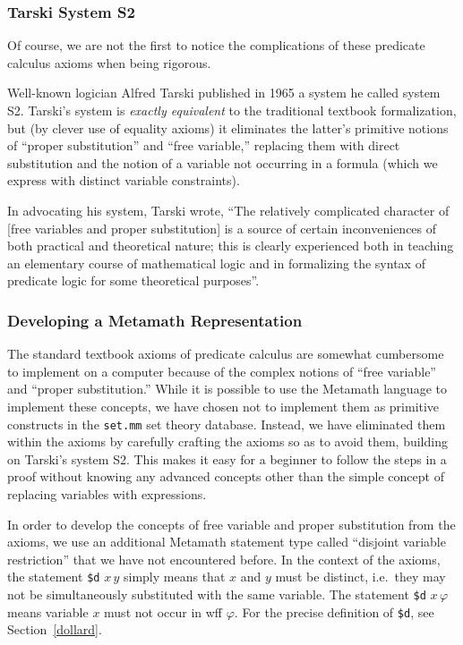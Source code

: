 \subsubsection{Tarski System S2}

Of course, we are not the first to notice the complications of these
predicate calculus axioms when being rigorous.

Well-known logician Alfred Tarski published in 1965
a system he called system S2\cite[p.~77]{Tarski1965}.
Tarski's system is \textit{exactly equivalent} to the traditional textbook
formalization, but (by clever use of equality axioms) it eliminates the
latter's primitive notions of ``proper substitution'' and ``free variable,''
replacing them with direct substitution and the notion of a variable
not occurring in a formula (which we express with distinct variable
constraints).

In advocating his system, Tarski wrote, ``The relatively complicated
character of [free variables and proper substitution] is a source
of certain inconveniences of both practical and theoretical nature;
this is clearly experienced both in teaching an elementary course of
mathematical logic and in formalizing the syntax of predicate logic for
some theoretical purposes''\cite[p.~61]{Tarski1965}.

\subsubsection{Developing a Metamath Representation}

The standard textbook axioms of predicate calculus are somewhat
cumbersome to implement on a computer because of the complex notions of
``free variable'' and ``proper
substitution.''
While it is possible to use the Metamath language to
implement these concepts, we have chosen not to implement them
as primitive constructs in the
\texttt{set.mm} set theory database.  Instead, we have eliminated them
within the axioms
by carefully crafting the axioms so as to avoid them,
building on Tarski's system S2.  This makes it
easy for a beginner to follow the steps in a proof without knowing any
advanced concepts other than the simple concept of
replacing
variables with expressions.

In order to develop the concepts of free variable and proper
substitution from the axioms, we use an additional
Metamath statement type called ``disjoint variable
restriction'' that we have not encountered
before.  In the context of the axioms, the statement \texttt{\$d} $ x\,
y$ simply means that $x$ and $y$ must be
distinct, i.e.\ they may not be simultaneously
substituted
with the same variable.  The statement \texttt{\$d} $ x\, \varphi$ means
variable $x$ must not occur in wff $\varphi$.  For the precise
definition of \texttt{\$d}, see Section~\ref{dollard}.

